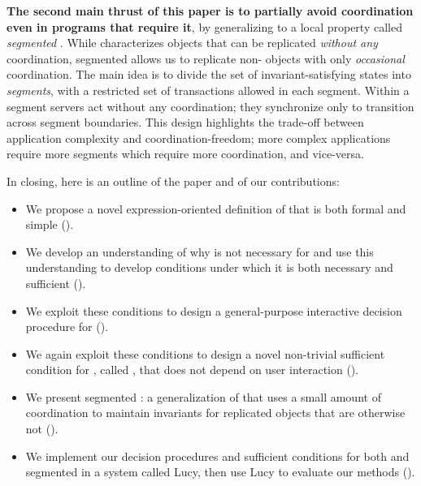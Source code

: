 \textbf{The second main thrust of this paper is to partially avoid coordination even in programs that require it}, by generalizing \invariantconfluence{} to a local property called \emph{segmented \invariantconfluence{}}. While \invariantconfluence{}
characterizes objects that can be replicated \emph{without any} coordination,
segmented \invariantconfluence{} allows us to replicate
non-\invariantconfluent{} objects with only \emph{occasional} coordination. The main
idea is to divide the set of invariant-satisfying states into \emph{segments}, with a restricted set of transactions allowed in each segment.
Within a segment servers act without any coordination; they synchronize only to
transition across segment boundaries. This design highlights the trade-off
between application complexity and coordination-freedom; more complex
applications require more segments which require more coordination, and
vice-versa.

In closing, here is an outline of the paper and of our contributions:
\begin{itemize}
  \item
    We propose a novel expression-oriented definition of \invariantconfluence{}
    that is both formal and simple ().

  \item
    We develop an understanding of why \invariantclosure{} is not necessary for
    \invariantconfluence{} and use this understanding to develop conditions
    under which it is both necessary and sufficient
    ().

  \item
    We exploit these conditions to design a general-purpose interactive
    decision procedure for \invariantconfluence{}
    ().

  \item
    We again exploit these conditions to design a novel non-trivial sufficient
    condition for \invariantconfluence{}, called \mergereducibility, that does
    not depend on user interaction ().

  \item
    We present segmented \invariantconfluence{}: a generalization of
    \invariantconfluence{} that uses a small amount of coordination to maintain
    invariants for replicated objects that are otherwise not
    \invariantconfluent{} ().

  \item
    We implement our decision procedures and sufficient conditions for both
    \invariantconfluence{} and segmented \invariantconfluence{} in a system
    called Lucy, then use Lucy to evaluate our methods ().
\end{itemize}
